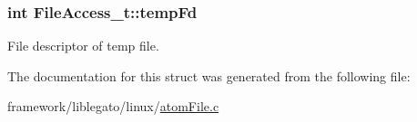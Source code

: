 \subsubsection[{\texorpdfstring{temp\+Fd}{tempFd}}]{\setlength{\rightskip}{0pt plus 5cm}int File\+Access\+\_\+t\+::temp\+Fd}\hypertarget{struct_file_access__t_aba117e10361be00bc5b22d3771b25569}{}\label{struct_file_access__t_aba117e10361be00bc5b22d3771b25569}


File descriptor of temp file. 



The documentation for this struct was generated from the following file\+:\begin{DoxyCompactItemize}
\item 
framework/liblegato/linux/\hyperlink{atom_file_8c}{atom\+File.\+c}\end{DoxyCompactItemize}

